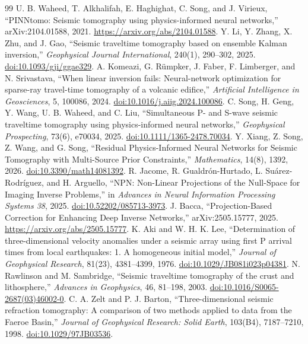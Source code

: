 \documentclass[11pt]{article}
\begin{document}
{\begin{thebibliography}{99}
 U. B. Waheed, T. Alkhalifah, E. Haghighat, C. Song, and J. Virieux, ``PINNtomo: Seismic tomography using physics-informed neural networks,'' arXiv:2104.01588, 2021. \url{https://arxiv.org/abs/2104.01588}.
 Y. Li, Y. Zhang, X. Zhu, and J. Gao, ``Seismic traveltime tomography based on ensemble Kalman inversion,'' \emph{Geophysical Journal International}, 240(1), 290--302, 2025. \href{https://doi.org/10.1093/gji/ggae329}{doi:10.1093/gji/ggae329}.
 A. Komeazi, G. R\"umpker, J. Faber, F. Limberger, and N. Srivastava, ``When linear inversion fails: Neural-network optimization for sparse-ray travel-time tomography of a volcanic edifice,'' \emph{Artificial Intelligence in Geosciences}, 5, 100086, 2024. \href{https://doi.org/10.1016/j.aiig.2024.100086}{doi:10.1016/j.aiig.2024.100086}.
 C. Song, H. Geng, Y. Wang, U. B. Waheed, and C. Liu, ``Simultaneous P- and S-wave seismic traveltime tomography using physics-informed neural networks,'' \emph{Geophysical Prospecting}, 73(6), e70034, 2025. \href{https://doi.org/10.1111/1365-2478.70034}{doi:10.1111/1365-2478.70034}.
 Y. Xiang, Z. Song, Z. Wang, and G. Song, ``Residual Physics-Informed Neural Networks for Seismic Tomography with Multi-Source Prior Constraints,'' \emph{Mathematics}, 14(8), 1392, 2026. \href{https://doi.org/10.3390/math14081392}{doi:10.3390/math14081392}.
 R. Jacome, R. Gualdr\'on-Hurtado, L. Su\'arez-Rodr\'iguez, and H. Arguello, ``NPN: Non-Linear Projections of the Null-Space for Imaging Inverse Problems,'' in \emph{Advances in Neural Information Processing Systems 38}, 2025. \href{https://doi.org/10.52202/085713-3973}{doi:10.52202/085713-3973}.
 J. Bacca, ``Projection-Based Correction for Enhancing Deep Inverse Networks,'' arXiv:2505.15777, 2025. \url{https://arxiv.org/abs/2505.15777}.
 K. Aki and W. H. K. Lee, ``Determination of three-dimensional velocity anomalies under a seismic array using first P arrival times from local earthquakes: 1. A homogeneous initial model,'' \emph{Journal of Geophysical Research}, 81(23), 4381--4399, 1976. \href{https://doi.org/10.1029/JB081i023p04381}{doi:10.1029/JB081i023p04381}.
 N. Rawlinson and M. Sambridge, ``Seismic traveltime tomography of the crust and lithosphere,'' \emph{Advances in Geophysics}, 46, 81--198, 2003. \href{https://doi.org/10.1016/S0065-2687(03)46002-0}{doi:10.1016/S0065-2687(03)46002-0}.
 C. A. Zelt and P. J. Barton, ``Three-dimensional seismic refraction tomography: A comparison of two methods applied to data from the Faeroe Basin,'' \emph{Journal of Geophysical Research: Solid Earth}, 103(B4), 7187--7210, 1998. \href{https://doi.org/10.1029/97JB03536}{doi:10.1029/97JB03536}.

\end{thebibliography}}
\end{document}

